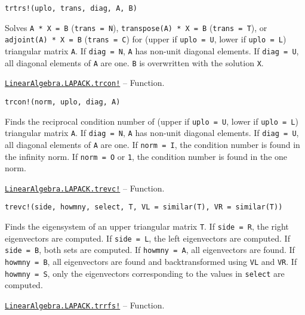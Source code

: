 \begin{adjustwidth}{2em}{0pt}


\begin{verbatim}
trtrs!(uplo, trans, diag, A, B)
\end{verbatim}

Solves \texttt{A * X = B} (\texttt{trans = N}), \texttt{transpose(A) * X = B} (\texttt{trans = T}), or \texttt{adjoint(A) * X = B} (\texttt{trans = C}) for (upper if \texttt{uplo = U}, lower if \texttt{uplo = L}) triangular matrix \texttt{A}. If \texttt{diag = N}, \texttt{A} has non-unit diagonal elements. If \texttt{diag = U}, all diagonal elements of \texttt{A} are one. \texttt{B} is overwritten with the solution \texttt{X}.



\end{adjustwidth}
\hypertarget{9926413427788620088}{} 
\hyperlink{9926413427788620088}{\texttt{LinearAlgebra.LAPACK.trcon!}}  -- {Function.}

\begin{adjustwidth}{2em}{0pt}


\begin{verbatim}
trcon!(norm, uplo, diag, A)
\end{verbatim}

Finds the reciprocal condition number of (upper if \texttt{uplo = U}, lower if \texttt{uplo = L}) triangular matrix \texttt{A}. If \texttt{diag = N}, \texttt{A} has non-unit diagonal elements. If \texttt{diag = U}, all diagonal elements of \texttt{A} are one. If \texttt{norm = I}, the condition number is found in the infinity norm. If \texttt{norm = O} or \texttt{1}, the condition number is found in the one norm.



\end{adjustwidth}
\hypertarget{7491620034849793338}{} 
\hyperlink{7491620034849793338}{\texttt{LinearAlgebra.LAPACK.trevc!}}  -- {Function.}

\begin{adjustwidth}{2em}{0pt}


\begin{verbatim}
trevc!(side, howmny, select, T, VL = similar(T), VR = similar(T))
\end{verbatim}

Finds the eigensystem of an upper triangular matrix \texttt{T}. If \texttt{side = R}, the right eigenvectors are computed. If \texttt{side = L}, the left eigenvectors are computed. If \texttt{side = B}, both sets are computed. If \texttt{howmny = A}, all eigenvectors are found. If \texttt{howmny = B}, all eigenvectors are found and backtransformed using \texttt{VL} and \texttt{VR}. If \texttt{howmny = S}, only the eigenvectors corresponding to the values in \texttt{select} are computed.



\end{adjustwidth}
\hypertarget{17047065310014133867}{} 
\hyperlink{17047065310014133867}{\texttt{LinearAlgebra.LAPACK.trrfs!}}  -- {Function.}

